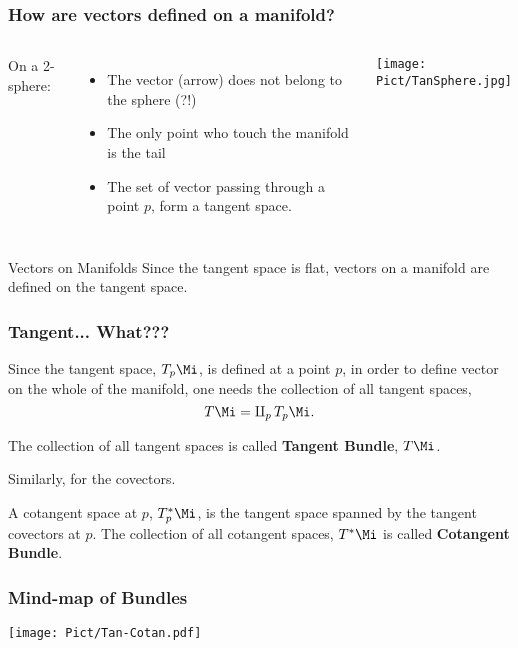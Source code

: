 \begin{frame}
  \frametitle{How are vectors defined on a manifold?}
  \begin{columns}
    On a 2-sphere:
    \begin{itemize}
    \item The vector (arrow) does not belong to the sphere (?!)
    \item The only point who touch the manifold is the tail
    \item The set of vector passing through a point $p$, form a tangent space.
    \end{itemize}
    \begin{center}
      \texttt{[image: Pict/TanSphere.jpg]}
    \end{center}
  \end{columns}

  \begin{alertblock}{Vectors on Manifolds}
    Since the tangent space is flat, vectors on a manifold are defined on the tangent space.
  \end{alertblock}
\end{frame}


\begin{frame}
  \frametitle{Tangent... What???}
  Since the tangent space, $T_p\Mi$, is defined at a point $p$, in order to define vector on the whole of the manifold, one needs the collection of all tangent spaces, $$T\Mi = \amalg_p\, T_p\Mi.$$
  \begin{definition}
    The collection of all tangent spaces is called \alert{\bf Tangent Bundle}, $T\Mi$.
  \end{definition}

  Similarly, for the covectors.
  \begin{definition}
    A cotangent space at $p$, $T^*_p\Mi$, is the tangent space spanned by the tangent covectors at $p$. The collection of all cotangent spaces, $T^*\Mi$ is called \alert{\bf Cotangent Bundle}.
  \end{definition}
\end{frame}

\begin{frame}
  \frametitle{Mind-map of Bundles}
  \begin{center}
    \texttt{[image: Pict/Tan-Cotan.pdf]}
  \end{center}
\end{frame}


